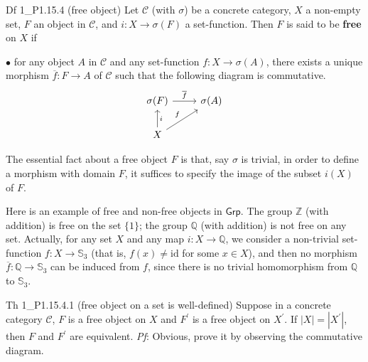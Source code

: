 \documentclass{article}
\begin{document}
\begin{Df}{Df 1\_P1.15.4 (free object)}
    Let $\mathscr{C}$ (with $\sigma$) be a concrete category, $X$ a non-empty set, $F$ an object in $\mathscr{C}$, and $i: X \to \sigma(F)$ a set-function. Then $F$ is said to be \textbf{free} on $X$ if
    \begin{compactitem}
        \item[$\bullet$] for any object $A$ in $\mathscr{C}$ and any set-function $f: X \to \sigma(A)$, there exists a unique morphism $\overline{f}: F \to A$ of $\mathscr{C}$ such that the following diagram is commutative.
        $$ \begin{tikzcd}
            \sigma(F) \arrow[r, "\overline{f}"] & \sigma(A) \\
            X \arrow[u, "i"'] \arrow[ru, "f"]
        \end{tikzcd} $$
    \end{compactitem}
\end{Df}

\begin{Rmk}{}
    \begin{compactenum}
        \item The essential fact about a free object $F$ is that, say $\sigma$ is trivial, in order to define a morphism with domain $F$, it suffices to specify the image of the subset $i(X)$ of $F$.
        \item Here is an example of free and non-free objects in $\mathsf{Grp}$. \textcolor{Th}{The group $\mathbb{Z}$ (with addition) is free on the set $\{1\}$; the group $\mathbb{Q}$ (with addition) is not free on any set. Actually, for any set $X$ and any map $i: X \to \mathbb{Q}$, we consider a non-trivial set-function $f: X \to \mathbb{S}_3$ (that is, $f(x)\neq\mathrm{id}$ for some $x\in X$), and then no morphism $\overline{f}: \mathbb{Q} \to \mathbb{S}_3$ can be induced from $f$, since there is no trivial homomorphism from $\mathbb{Q}$ to $\mathbb{S}_3$.}
    \end{compactenum}
\end{Rmk}

\begin{Th}{Th 1\_P1.15.4.1 (free object on a set is well-defined)}
    Suppose in a concrete category $\mathscr{C}$, $F$ is a free object on $X$ and $F^\prime$ is a free object on $X^\prime$. If $|X| = |X^\prime|$, then $F$ and $F^\prime$ are equivalent.
    \tcblower
    \textit{Pf}: Obvious, prove it by observing the commutative diagram.
\end{Th}
\end{document}
